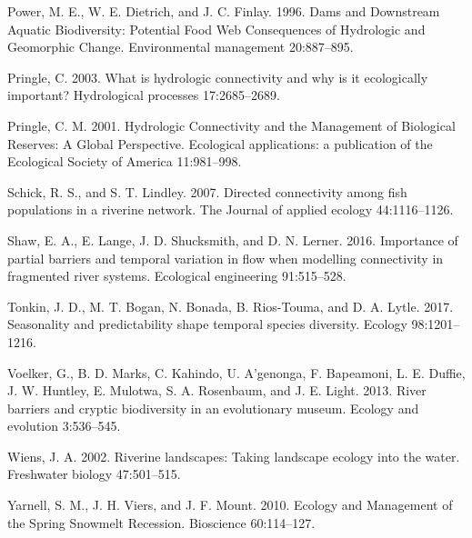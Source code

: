 \documentclass[twoside,12pt,final]{ucthesis-CA2012}
\begin{document}
\begin{ucmainmatter}
\leavevmode\hypertarget{ref-power_dams_1996}{}%
Power, M. E., W. E. Dietrich, and J. C. Finlay. 1996. Dams and
Downstream Aquatic Biodiversity: Potential Food Web Consequences of
Hydrologic and Geomorphic Change. Environmental management 20:887--895.

\leavevmode\hypertarget{ref-pringle_what_2003}{}%
Pringle, C. 2003. What is hydrologic connectivity and why is it
ecologically important? Hydrological processes 17:2685--2689.

\leavevmode\hypertarget{ref-pringle_hydrologic_2001}{}%
Pringle, C. M. 2001. Hydrologic Connectivity and the Management of
Biological Reserves: A Global Perspective. Ecological applications: a
publication of the Ecological Society of America 11:981--998.

\leavevmode\hypertarget{ref-schick_directed_2007}{}%
Schick, R. S., and S. T. Lindley. 2007. Directed connectivity among fish
populations in a riverine network. The Journal of applied ecology
44:1116--1126.

\leavevmode\hypertarget{ref-shaw_importance_2016}{}%
Shaw, E. A., E. Lange, J. D. Shucksmith, and D. N. Lerner. 2016.
Importance of partial barriers and temporal variation in flow when
modelling connectivity in fragmented river systems. Ecological
engineering 91:515--528.

\leavevmode\hypertarget{ref-tonkin_seasonality_2017}{}%
Tonkin, J. D., M. T. Bogan, N. Bonada, B. Rios-Touma, and D. A. Lytle.
2017. Seasonality and predictability shape temporal species diversity.
Ecology 98:1201--1216.

\leavevmode\hypertarget{ref-voelker_river_2013}{}%
Voelker, G., B. D. Marks, C. Kahindo, U. A'genonga, F. Bapeamoni, L. E.
Duffie, J. W. Huntley, E. Mulotwa, S. A. Rosenbaum, and J. E. Light.
2013. River barriers and cryptic biodiversity in an evolutionary museum.
Ecology and evolution 3:536--545.

\leavevmode\hypertarget{ref-wiens_riverine_2002}{}%
Wiens, J. A. 2002. Riverine landscapes: Taking landscape ecology into
the water. Freshwater biology 47:501--515.

\leavevmode\hypertarget{ref-yarnell_ecology_2010}{}%
Yarnell, S. M., J. H. Viers, and J. F. Mount. 2010. Ecology and
Management of the Spring Snowmelt Recession. Bioscience 60:114--127.

\end{ucmainmatter}
\end{document}
